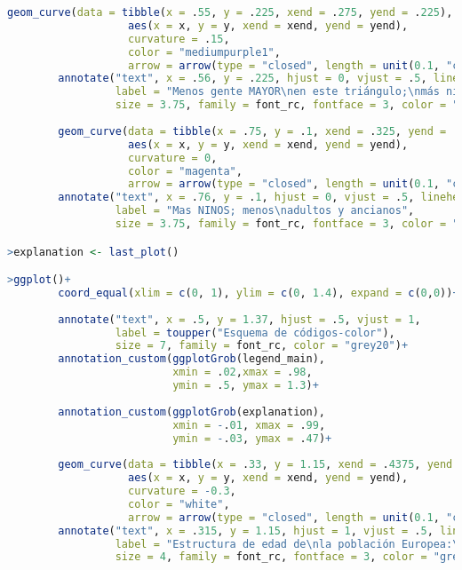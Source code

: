 \begin{lstlisting}[language=R, caption=C\'odigo 2 con la construcci\'on del mapa]
        geom_curve(data = tibble(x = .55, y = .225, xend = .275, yend = .225), 
                   aes(x = x, y = y, xend = xend, yend = yend),
                   curvature = .15,
                   color = "mediumpurple1", 
                   arrow = arrow(type = "closed", length = unit(0.1, "cm")))+
        annotate("text", x = .56, y = .225, hjust = 0, vjust = .5, lineheight = .9,
                 label = "Menos gente MAYOR\nen este triángulo;\nmás niños y adultos",
                 size = 3.75, family = font_rc, fontface = 3, color = "mediumpurple3")+
        
        geom_curve(data = tibble(x = .75, y = .1, xend = .325, yend = .1), 
                   aes(x = x, y = y, xend = xend, yend = yend),
                   curvature = 0,
                   color = "magenta", 
                   arrow = arrow(type = "closed", length = unit(0.1, "cm")))+
        annotate("text", x = .76, y = .1, hjust = 0, vjust = .5, lineheight = .9,
                 label = "Mas NINOS; menos\nadultos y ancianos",
                 size = 3.75, family = font_rc, fontface = 3, color = "magenta3")

>explanation <- last_plot()

>ggplot()+
        coord_equal(xlim = c(0, 1), ylim = c(0, 1.4), expand = c(0,0))+
       
        annotate("text", x = .5, y = 1.37, hjust = .5, vjust = 1,
                 label = toupper("Esquema de códigos-color"),
                 size = 7, family = font_rc, color = "grey20")+
        annotation_custom(ggplotGrob(legend_main),
                          xmin = .02,xmax = .98, 
                          ymin = .5, ymax = 1.3)+
            
        annotation_custom(ggplotGrob(explanation),
                          xmin = -.01, xmax = .99, 
                          ymin = -.03, ymax = .47)+
       
        geom_curve(data = tibble(x = .33, y = 1.15, xend = .4375, yend = .8175), 
                   aes(x = x, y = y, xend = xend, yend = yend),
                   curvature = -0.3,
                   color = "white", 
                   arrow = arrow(type = "closed", length = unit(0.1, "cm")))+
        annotate("text", x = .315, y = 1.15, hjust = 1, vjust = .5, lineheight = .9,
                 label = "Estructura de edad de\nla población Europea:\nJovenes -- 16.7% \nEdad laboral -- 65.8% \nAncianos -- 17.4%",
                 size = 4, family = font_rc, fontface = 3, color = "grey20")+
        

\end{lstlisting}
